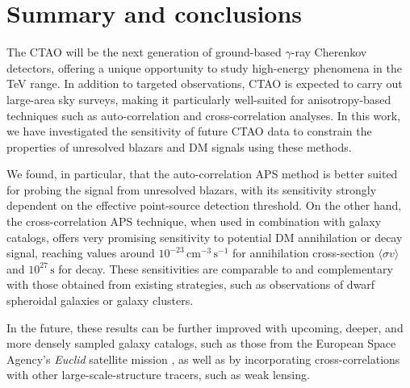 \section{Summary and conclusions}\label{sec:xcorr:conclusions}

The CTAO will be the next generation of ground-based $\gamma$-ray Cherenkov detectors, offering a unique opportunity to study high-energy phenomena in the TeV range.  In addition to targeted observations, CTAO is expected to carry out large-area sky surveys, making it particularly well-suited for anisotropy-based techniques such as auto-correlation and cross-correlation analyses.
In this work, we have investigated the sensitivity of future CTAO data to constrain the properties of unresolved blazars and DM signals using these methods.

We found, in particular, that the auto-correlation APS method is better suited for probing the signal from unresolved blazars, with its sensitivity strongly dependent on the effective {point-}source detection threshold. On the other hand, the cross-correlation APS technique, when used in combination with galaxy catalogs, offers very promising sensitivity to potential DM annihilation or decay signal, reaching values around $10^{-23}\,\mathrm{cm^{-3}\,s^{-1}}$ for annihilation cross-section $\langle \sigma v \rangle$ and $10^{27}\,\mathrm{s}$ for decay.
These sensitivities are comparable to and complementary with those obtained from existing strategies, such as observations of dwarf spheroidal galaxies or galaxy clusters.


In the future, these results can be further improved with upcoming, deeper, and more densely sampled galaxy catalogs, such as those from the European Space Agency's \textit{Euclid} satellite mission \cite{2024arXiv240513491E}, as well as by incorporating cross-correlations with other large-scale-structure tracers, such as weak lensing.

